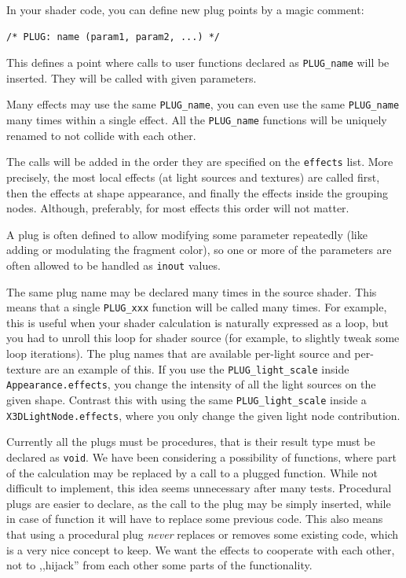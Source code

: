 \documentclass{egpubl}
\newenvironment{mycode}
{\begin{mycodecore}}
{\end{mycodecore}
\vspace{-0.1in}}
\begin{document}
In your shader code, you can define new plug points by a
magic comment:

\begin{mycode}
\begin{Verbatim}[commandchars=\\\{\},fontsize=\small]
/* PLUG: name (param1, param2, ...) */
\end{Verbatim}
\end{mycode}

This defines a point where calls to user functions declared as
\texttt{PLUG\_name} will be inserted. They will be called with given
parameters.

Many effects may use the same \texttt{PLUG\_name},
you can even use the same \texttt{PLUG\_name} many times within a single
effect. All the \texttt{PLUG\_name} functions
will be uniquely renamed to not collide with each other.

The calls will be added in the order they are specified on the
\texttt{effects} list. More precisely, the most local effects
(at light sources and textures) are called first, then the effects
at shape appearance, and finally the effects inside the grouping nodes.
Although, preferably, for most effects this order will not matter.

A plug is often defined to allow modifying some parameter
repeatedly (like adding or modulating the fragment color),
so one or more of the parameters are often allowed to be handled
as \texttt{inout} values.

The same plug name may be declared many times in the source shader.
This means that a single \texttt{PLUG\_xxx} function will be called
many times. For example, this is useful when your shader calculation is naturally
expressed as a loop, but you had to unroll this loop for shader source
(for example, to slightly tweak some loop iterations).
The plug names that are available per-light source and per-texture
are an example of this.
If you use the \texttt{PLUG\_light\_scale}
inside \texttt{Appearance.effects}, you change the intensity
of all the light sources on the given shape. Contrast this with using
the same \texttt{PLUG\_light\_scale} inside a \texttt{X3DLightNode.effects},
where you only change the given light node contribution.

Currently all the plugs must be procedures, that is their result type
must be declared as \texttt{void}. We have been considering
a possibility of functions, where part of the calculation may be replaced
by a call to a plugged function. While not difficult to implement,
this idea seems unnecessary after many tests.
Procedural plugs are easier to declare, as the call to the plug
may be simply inserted, while in case of function it will have to replace
some previous code. This also means that using a procedural plug
\textit{never} replaces or removes some existing code, which is a very nice
concept to keep. We want the effects to cooperate with each other,
not to ,,hijack'' from each other some parts of the functionality.
\end{document}
